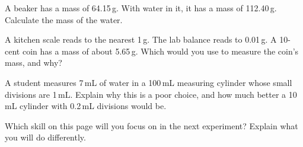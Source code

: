 \task A beaker has a mass of 64.15\,g. With water in it, it has a mass of 112.40\,g. Calculate the mass of the water.
\workbox{3.5cm}

\begin{yr8box}
\begin{keepext}
\exttask A kitchen scale reads to the nearest 1\,g. The lab balance reads to 0.01\,g. A 10-cent coin has a mass of about 5.65\,g. Which would you use to measure the coin's mass, and why?
\answerbox{5cm}
\end{keepext}
\begin{keepext}
\exttask A student measures 7\,mL of water in a 100\,mL measuring cylinder whose small divisions are 1\,mL. Explain why this is a poor choice, and how much better a 10\,mL cylinder with 0.2\,mL divisions would be.
\answerbox{5cm}
\end{keepext}
\end{yr8box}


\begin{skillcheck}
\end{skillcheck}

\task Which skill on this page will you focus on in the next experiment? Explain what you will do differently.
\answerbox{5cm}
